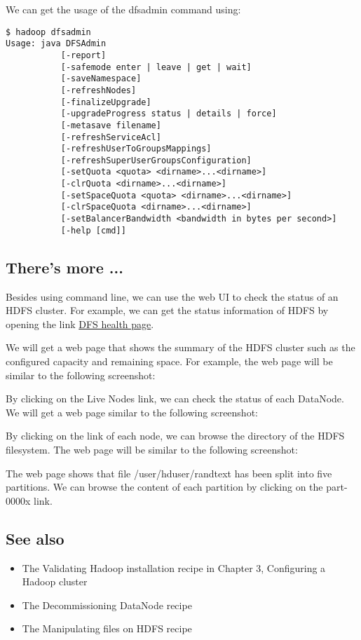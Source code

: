 We can get the usage of the dfsadmin command using: 
\begin{verbatim}
$ hadoop dfsadmin
Usage: java DFSAdmin
           [-report]
           [-safemode enter | leave | get | wait]
           [-saveNamespace]
           [-refreshNodes]
           [-finalizeUpgrade]
           [-upgradeProgress status | details | force]
           [-metasave filename]
           [-refreshServiceAcl]
           [-refreshUserToGroupsMappings]
           [-refreshSuperUserGroupsConfiguration]
           [-setQuota <quota> <dirname>...<dirname>]
           [-clrQuota <dirname>...<dirname>]
           [-setSpaceQuota <quota> <dirname>...<dirname>]
           [-clrSpaceQuota <dirname>...<dirname>]
           [-setBalancerBandwidth <bandwidth in bytes per second>]
           [-help [cmd]]
\end{verbatim}

\subsection*{There's more ...}
Besides using command line, we can use the web UI to check the status of an HDFS cluster. For example, we can get the status information of HDFS by opening the link \href{http://master:50070/dfshealth.jsp}{DFS health page}.

We will get a web page that shows the summary of the HDFS cluster such as the configured capacity and remaining space. For example, the web page will be similar to the following screenshot:

By clicking on the Live Nodes link, we can check the status of each DataNode. We will get a web page similar to the following screenshot:

By clicking on the link of each node, we can browse the directory of the HDFS filesystem. The web page will be similar to the following screenshot:

The web page shows that file /user/hduser/randtext has been split into five partitions. We can browse the content of each partition by clicking on the part-0000x link.

\subsection*{See also}
\begin{itemize}
  \item The Validating Hadoop installation recipe in Chapter 3, Configuring a Hadoop cluster
  \item The Decommissioning DataNode recipe
  \item The Manipulating files on HDFS recipe
\end{itemize}

